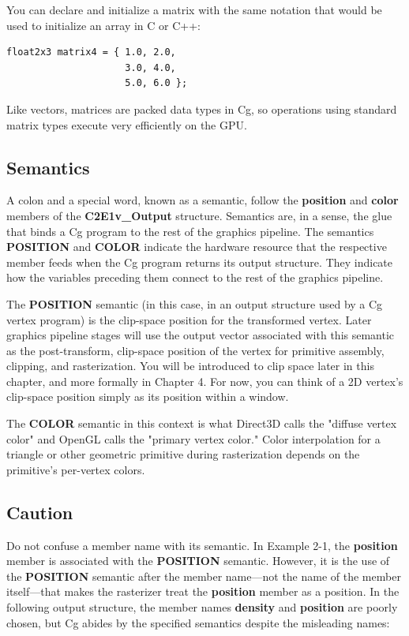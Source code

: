 \documentclass{book}
\begin{document}
You can declare and initialize a matrix with the same notation that would be used to initialize an array in C or C++:

\FloatBarrier
\begin{lstlisting}
float2x3 matrix4 = { 1.0, 2.0,
                     3.0, 4.0,
                     5.0, 6.0 };
\end{lstlisting}
\FloatBarrier

Like vectors, matrices are packed data types in Cg, so operations using standard matrix types execute very efficiently on the GPU.

\subsection{Semantics}

A colon and a special word, known as a semantic, follow the \textbf{position} and \textbf{color} members of the \textbf{C2E1v_Output} structure. Semantics are, in a sense, the glue that binds a Cg program to the rest of the graphics pipeline. The semantics \textbf{POSITION} and \textbf{COLOR} indicate the hardware resource that the respective member feeds when the Cg program returns its output structure. They indicate how the variables preceding them connect to the rest of the graphics pipeline.

The \textbf{POSITION} semantic (in this case, in an output structure used by a Cg vertex program) is the clip-space position for the transformed vertex. Later graphics pipeline stages will use the output vector associated with this semantic as the post-transform, clip-space position of the vertex for primitive assembly, clipping, and rasterization. You will be introduced to clip space later in this chapter, and more formally in Chapter 4. For now, you can think of a 2D vertex's clip-space position simply as its position within a window.

The \textbf{COLOR} semantic in this context is what Direct3D calls the "diffuse vertex color" and OpenGL calls the "primary vertex color." Color interpolation for a triangle or other geometric primitive during rasterization depends on the primitive's per-vertex colors.

\subsection*{Caution}

Do not confuse a member name with its semantic. In Example 2-1, the \textbf{position} member is associated with the \textbf{POSITION} semantic. However, it is the use of the \textbf{POSITION} semantic after the member name—not the name of the member itself—that makes the rasterizer treat the \textbf{position} member as a position. In the following output structure, the member names \textbf{density} and \textbf{position} are poorly chosen, but Cg abides by the specified semantics despite the misleading names:
\end{document}

